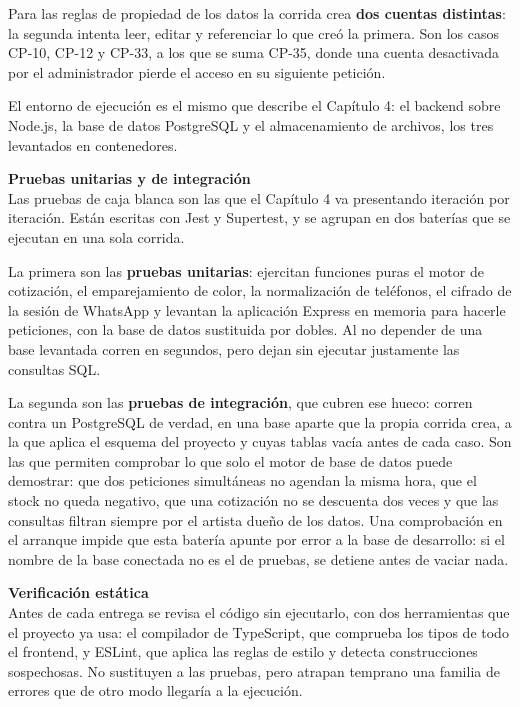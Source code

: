\documentclass[12pt,letterpaper,oneside]{report}
\newcommand{\tituloparpegado}[1]{\par\textbf{#1}\\\indent\ignorespaces}
\begin{document}
Para las reglas de propiedad de los datos la corrida crea \textbf{dos cuentas distintas}: la segunda intenta leer, editar y referenciar lo que creó la primera. Son los casos CP-10, CP-12 y CP-33, a los que se suma CP-35, donde una cuenta desactivada por el administrador pierde el acceso en su siguiente petición.

El entorno de ejecución es el mismo que describe el Capítulo 4: el backend sobre Node.js, la base de datos PostgreSQL y el almacenamiento de archivos, los tres levantados en contenedores.

\vspace{\parskip}
\tituloparpegado{Pruebas unitarias y de integración}
Las pruebas de caja blanca son las que el Capítulo 4 va presentando iteración por iteración. Están escritas con Jest y Supertest, y se agrupan en dos baterías que se ejecutan en una sola corrida.

La primera son las \textbf{pruebas unitarias}: ejercitan funciones puras el motor de cotización, el emparejamiento de color, la normalización de teléfonos, el cifrado de la sesión de WhatsApp y levantan la aplicación Express en memoria para hacerle peticiones, con la base de datos sustituida por dobles. Al no depender de una base levantada corren en segundos, pero dejan sin ejecutar justamente las consultas SQL.

La segunda son las \textbf{pruebas de integración}, que cubren ese hueco: corren contra un PostgreSQL de verdad, en una base aparte que la propia corrida crea, a la que aplica el esquema del proyecto y cuyas tablas vacía antes de cada caso. Son las que permiten comprobar lo que solo el motor de base de datos puede demostrar: que dos peticiones simultáneas no agendan la misma hora, que el stock no queda negativo, que una cotización no se descuenta dos veces y que las consultas filtran siempre por el artista dueño de los datos. Una comprobación en el arranque impide que esta batería apunte por error a la base de desarrollo: si el nombre de la base conectada no es el de pruebas, se detiene antes de vaciar nada.

\vspace{\parskip}
\tituloparpegado{Verificación estática}
Antes de cada entrega se revisa el código sin ejecutarlo, con dos herramientas que el proyecto ya usa: el compilador de TypeScript, que comprueba los tipos de todo el frontend, y ESLint, que aplica las reglas de estilo y detecta construcciones sospechosas. No sustituyen a las pruebas, pero atrapan temprano una familia de errores que de otro modo llegaría a la ejecución.
\end{document}
